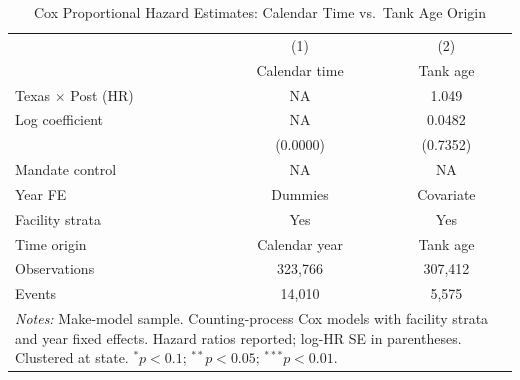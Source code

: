 \begin{table}[htbp]\centering
\caption{Cox Proportional Hazard Estimates: Calendar Time vs.\ Tank Age Origin}
\label{tbl:cox_did}
\begin{tabular}{lcc}\toprule
 & (1) & (2) \\
 & Calendar time & Tank age \\\midrule
Texas $\times$ Post (HR) & NA & 1.049 \\
Log coefficient & NA & 0.0482 \\
 & (0.0000) & (0.7352) \\
\addlinespace
Mandate control & NA & NA \\
\midrule
Year FE & Dummies & Covariate \\
Facility strata & Yes & Yes \\
Time origin & Calendar year & Tank age \\
Observations & 323,766 & 307,412 \\
Events & 14,010 & 5,575 \\
\bottomrule
\multicolumn{3}{p{0.85\textwidth}}{\footnotesize \textit{Notes:} 
Make-model sample. Counting-process Cox models with facility strata and 
year fixed effects. Hazard ratios reported; log-HR SE in parentheses. 
Clustered at state. $^{*}p<0.1$; $^{**}p<0.05$; $^{***}p<0.01$.}
\end{tabular}\end{table}
